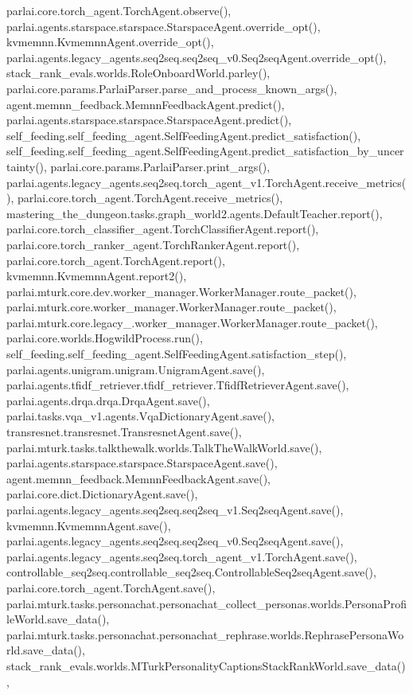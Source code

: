 parlai.\+core.\+torch\+\_\+agent.\+Torch\+Agent.\+observe(), parlai.\+agents.\+starspace.\+starspace.\+Starspace\+Agent.\+override\+\_\+opt(), kvmemnn.\+Kvmemnn\+Agent.\+override\+\_\+opt(), parlai.\+agents.\+legacy\+\_\+agents.\+seq2seq.\+seq2seq\+\_\+v0.\+Seq2seq\+Agent.\+override\+\_\+opt(), stack\+\_\+rank\+\_\+evals.\+worlds.\+Role\+Onboard\+World.\+parley(), parlai.\+core.\+params.\+Parlai\+Parser.\+parse\+\_\+and\+\_\+process\+\_\+known\+\_\+args(), agent.\+memnn\+\_\+feedback.\+Memnn\+Feedback\+Agent.\+predict(), parlai.\+agents.\+starspace.\+starspace.\+Starspace\+Agent.\+predict(), self\+\_\+feeding.\+self\+\_\+feeding\+\_\+agent.\+Self\+Feeding\+Agent.\+predict\+\_\+satisfaction(), self\+\_\+feeding.\+self\+\_\+feeding\+\_\+agent.\+Self\+Feeding\+Agent.\+predict\+\_\+satisfaction\+\_\+by\+\_\+uncertainty(), parlai.\+core.\+params.\+Parlai\+Parser.\+print\+\_\+args(), parlai.\+agents.\+legacy\+\_\+agents.\+seq2seq.\+torch\+\_\+agent\+\_\+v1.\+Torch\+Agent.\+receive\+\_\+metrics(), parlai.\+core.\+torch\+\_\+agent.\+Torch\+Agent.\+receive\+\_\+metrics(), mastering\+\_\+the\+\_\+dungeon.\+tasks.\+graph\+\_\+world2.\+agents.\+Default\+Teacher.\+report(), parlai.\+core.\+torch\+\_\+classifier\+\_\+agent.\+Torch\+Classifier\+Agent.\+report(), parlai.\+core.\+torch\+\_\+ranker\+\_\+agent.\+Torch\+Ranker\+Agent.\+report(), parlai.\+core.\+torch\+\_\+agent.\+Torch\+Agent.\+report(), kvmemnn.\+Kvmemnn\+Agent.\+report2(), parlai.\+mturk.\+core.\+dev.\+worker\+\_\+manager.\+Worker\+Manager.\+route\+\_\+packet(), parlai.\+mturk.\+core.\+worker\+\_\+manager.\+Worker\+Manager.\+route\+\_\+packet(), parlai.\+mturk.\+core.\+legacy\+\_.\+worker\+\_\+manager.\+Worker\+Manager.\+route\+\_\+packet(), parlai.\+core.\+worlds.\+Hogwild\+Process.\+run(), self\+\_\+feeding.\+self\+\_\+feeding\+\_\+agent.\+Self\+Feeding\+Agent.\+satisfaction\+\_\+step(), parlai.\+agents.\+unigram.\+unigram.\+Unigram\+Agent.\+save(), parlai.\+agents.\+tfidf\+\_\+retriever.\+tfidf\+\_\+retriever.\+Tfidf\+Retriever\+Agent.\+save(), parlai.\+agents.\+drqa.\+drqa.\+Drqa\+Agent.\+save(), parlai.\+tasks.\+vqa\+\_\+v1.\+agents.\+Vqa\+Dictionary\+Agent.\+save(), transresnet.\+transresnet.\+Transresnet\+Agent.\+save(), parlai.\+mturk.\+tasks.\+talkthewalk.\+worlds.\+Talk\+The\+Walk\+World.\+save(), parlai.\+agents.\+starspace.\+starspace.\+Starspace\+Agent.\+save(), agent.\+memnn\+\_\+feedback.\+Memnn\+Feedback\+Agent.\+save(), parlai.\+core.\+dict.\+Dictionary\+Agent.\+save(), parlai.\+agents.\+legacy\+\_\+agents.\+seq2seq.\+seq2seq\+\_\+v1.\+Seq2seq\+Agent.\+save(), kvmemnn.\+Kvmemnn\+Agent.\+save(), parlai.\+agents.\+legacy\+\_\+agents.\+seq2seq.\+seq2seq\+\_\+v0.\+Seq2seq\+Agent.\+save(), parlai.\+agents.\+legacy\+\_\+agents.\+seq2seq.\+torch\+\_\+agent\+\_\+v1.\+Torch\+Agent.\+save(), controllable\+\_\+seq2seq.\+controllable\+\_\+seq2seq.\+Controllable\+Seq2seq\+Agent.\+save(), parlai.\+core.\+torch\+\_\+agent.\+Torch\+Agent.\+save(), parlai.\+mturk.\+tasks.\+personachat.\+personachat\+\_\+collect\+\_\+personas.\+worlds.\+Persona\+Profile\+World.\+save\+\_\+data(), parlai.\+mturk.\+tasks.\+personachat.\+personachat\+\_\+rephrase.\+worlds.\+Rephrase\+Persona\+World.\+save\+\_\+data(), stack\+\_\+rank\+\_\+evals.\+worlds.\+M\+Turk\+Personality\+Captions\+Stack\+Rank\+World.\+save\+\_\+data(), 